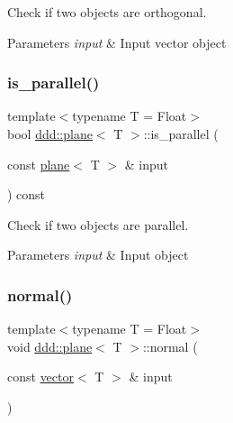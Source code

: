 Check if two objects are orthogonal. 


\begin{DoxyParams}{Parameters}
{\em input} & Input vector object \\
\hline
\end{DoxyParams}
\mbox{\label{classddd_1_1plane_af94adfd507e373307fea80b6c4061d80}} 
\subsubsection{\texorpdfstring{is\+\_\+parallel()}{is\_parallel()}}
{\footnotesize\ttfamily template$<$typename T = Float$>$ \\
bool \hyperlink{classddd_1_1plane}{ddd\+::plane}$<$ T $>$\+::is\+\_\+parallel (\begin{DoxyParamCaption}\item[{const \hyperlink{classddd_1_1plane}{plane}$<$ T $>$ \&}]{input }\end{DoxyParamCaption}) const\hspace{0.3cm}{\ttfamily [inline]}}



Check if two objects are parallel. 


\begin{DoxyParams}{Parameters}
{\em input} & Input object \\
\hline
\end{DoxyParams}
\mbox{\label{classddd_1_1plane_a938cb0c882eeb20b1b600bb9f89fb039}} 
\subsubsection{\texorpdfstring{normal()}{normal()}}
{\footnotesize\ttfamily template$<$typename T = Float$>$ \\
void \hyperlink{classddd_1_1plane}{ddd\+::plane}$<$ T $>$\+::normal (\begin{DoxyParamCaption}\item[{const \hyperlink{classddd_1_1vector}{vector}$<$ T $>$ \&}]{input }\end{DoxyParamCaption})\hspace{0.3cm}{\ttfamily [inline]}}



